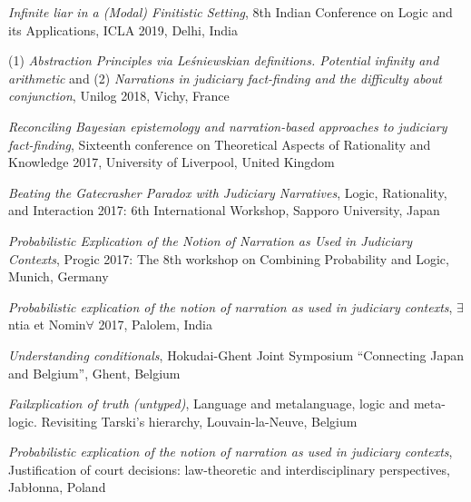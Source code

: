 \documentclass[10pt, a4paper]{article}
\newcommand{\years}[1]{\marginnote{\normalsize #1}}
\begin{document}
\years{2018} 

\emph{Infinite liar in a (Modal) Finitistic Setting}, 8th Indian Conference on Logic and its Applications, ICLA 2019, Delhi, India

\vspace{0.5mm}

(1) \emph{Abstraction Principles via Le{\'s}niewskian definitions. Potential infinity and arithmetic} and (2) \emph{Narrations in judiciary fact-finding and the difficulty about conjunction}, Unilog 2018, Vichy, France

\years{2017} \emph{Reconciling Bayesian epistemology and narration-based approaches to judiciary fact-finding},   Sixteenth conference on
Theoretical Aspects of Rationality and Knowledge 2017, University of Liverpool, United Kingdom


\vspace{0.5mm}


\emph{Beating the Gatecrasher Paradox with Judiciary Narratives},  
Logic, Rationality, and Interaction 2017: 6th International Workshop, Sapporo University, Japan



\vspace{0.5mm}


 \emph{Probabilistic Explication of the Notion of Narration as Used in Judiciary Contexts}, Progic 2017: The 8th workshop on Combining Probability and Logic,  Munich, Germany



\vspace{0.5mm}

\emph{Probabilistic explication of the notion of narration as used in judiciary contexts}, $\exists$ntia et Nomin$\forall$ 2017,  Palolem, India


\vspace{0.5mm}


\years{2016} \emph{Understanding conditionals}, Hokudai-Ghent Joint Symposium “Connecting Japan and Belgium”,  Ghent, Belgium


\vspace{0.5mm}


\emph{Failxplication of truth (untyped)}, Language and metalanguage, logic and meta-logic. Revisiting Tarski's hierarchy,  Louvain-la-Neuve, Belgium


\vspace{0.5mm}

\emph{Probabilistic explication of the notion of narration as used in judiciary contexts}, Justification of court decisions: law-theoretic and interdisciplinary perspectives,  Jab{\l}onna, Poland
\end{document}
